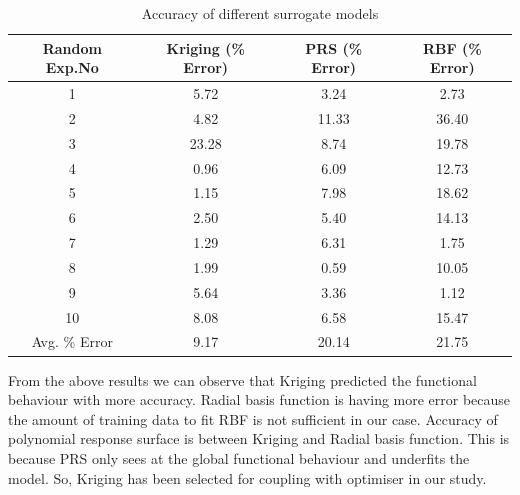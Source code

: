\begin{table}[H]
	\caption{Accuracy of different surrogate models}
	\label{Accuracy of different surrogate models}
	\centering
	\begin{tabular}{cccc}
		\hline \hline
		Random Exp.No	&Kriging (\% Error)	&PRS (\% Error)	&RBF (\% Error) \\
		\hline \hline
		1 &5.72 &3.24	&2.73 \\
		2 &4.82	&11.33	&36.40 \\
		3 &23.28 &8.74	&19.78 \\
		4 &0.96	&6.09	&12.73 \\
		5 &1.15	&7.98	&18.62 \\
		6 &2.50	&5.40	&14.13 \\
		7 &1.29	&6.31	&1.75 \\
		8 &1.99	&0.59	&10.05 \\
		9 &5.64	&3.36	&1.12 \\
		10 &8.08 &6.58	&15.47 \\
		\hline \hline
		Avg. \% Error	&9.17	&20.14	&21.75 \\
		\hline \hline
	\end{tabular}
\end{table}


From the above results we can observe that Kriging predicted the functional behaviour with more accuracy. Radial basis function is having more error because the amount of training data to fit RBF is not sufficient in our case. Accuracy of polynomial response surface is between Kriging and Radial basis function. This is because PRS only sees at the global functional behaviour and underfits the model. So, Kriging has been selected for coupling with optimiser in our study.

